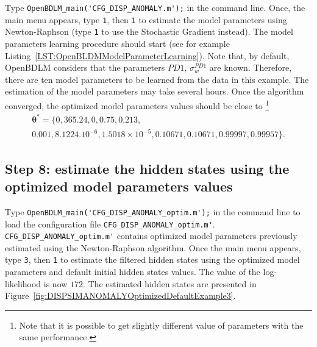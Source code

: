 Type \colorbox{light-gray}{\lstinline[basicstyle = \mlttfamily \small, backgroundcolor = \color{light-gray}]!OpenBDLM_main('CFG_DISP_ANOMALY.m');!} in the \MATLAB{} command line.
Once, the main menu appears, type  \colorbox{light-gray}{\lstinline[basicstyle = \mlttfamily \small, backgroundcolor = \color{light-gray}]!1!}, then \colorbox{light-gray}{\lstinline[basicstyle = \mlttfamily \small, backgroundcolor = \color{light-gray}]!1!} to estimate the model parameters using Newton-Raphson (type  \colorbox{light-gray}{\lstinline[basicstyle = \mlttfamily \small, backgroundcolor = \color{light-gray}]!1!} to use the Stochastic Gradient instead).
The model parameters learning procedure should start (see for example Listing~\ref{LST:OpenBLDMModelParameterLearning}).
Note that, by default, OpenBDLM considers that the parameters $PD1$, $\sigma_{w}^{PD1}$ are known.
Therefore, there are ten model parameters to be learned from the data in this example.
The estimation of the model parameters may take several hours.
Once the algorithm converged, the optimized model parameters values should be close to  \footnote{Note that it is possible to get slightly different value of parameters with the same performance.}
\begin{gather*}
\bm\theta^{\text{*}}=\{0, 365.24, 0, 0.75, 0.213, \\
0.001, 8.1224.10^{-6}, 1.5018\times10^{-5}, 0.10671, 0.10671, 0.99997, 0.99957\}.
\end{gather*}


\subsection{Step 8: estimate the hidden states using the optimized model parameters values}

Type \colorbox{light-gray}{\lstinline[basicstyle = \mlttfamily \small, backgroundcolor = \color{light-gray}]!OpenBDLM_main('CFG_DISP_ANOMALY_optim.m');!} in the \MATLAB{} command line to load the configuration file  \lstinline[basicstyle = \mlttfamily \small, backgroundcolor = \color{light-gray}]!CFG_DISP_ANOMALY_optim.m'!.
 \lstinline[basicstyle = \mlttfamily \small, backgroundcolor = \color{light-gray}]!CFG_DISP_ANOMALY_optim.m'! contains optimized model parameters previously estimated using the Newton-Raphson algorithm.
Once the main menu appears, type  \colorbox{light-gray}{\lstinline[basicstyle = \mlttfamily \small, backgroundcolor = \color{light-gray}]!3!}, then \colorbox{light-gray}{\lstinline[basicstyle = \mlttfamily \small, backgroundcolor = \color{light-gray}]!1!} to estimate the filtered hidden states using the optimized model parameters and default initial hidden states values.
The value of the log-likelihood is now $172$.
The estimated hidden states are presented in Figure~\ref{fig:DISPSIMANOMALYOptimizedDefaultExample3}.


